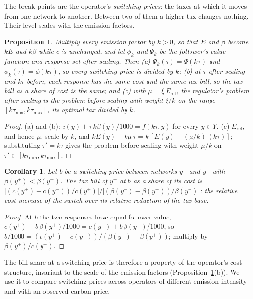\documentclass[review,11pt,nonatbib]{elsarticle}
\newtheorem{proposition}{Proposition}
\newtheorem{corollary}{Corollary}
\theoremstyle{remark}
\newcommand{\tmin}{\tau_{\min}}
\newcommand{\tmax}{\tau_{\max}}
\newcommand{\Eref}{E_{\mathrm{ref}}}
\begin{document}
The break points are the operator's \emph{switching prices}: the taxes at which it moves from one network to another. Between two of them a higher tax changes nothing. Their level scales with the emission factors.

\begin{proposition}\label{prop:scale}
Multiply every emission factor by $k > 0$, so that $E$ and $\beta$ become $kE$ and $k\beta$ while $c$ is unchanged, and let $\phi_k$ and $\Psi_k$ be the follower's value function and response set after scaling. Then (a) $\Psi_k(\tau) = \Psi(k\tau)$ and $\phi_k(\tau) = \phi(k\tau)$, so every switching price is divided by $k$; (b) at $\tau$ after scaling and $k\tau$ before, each response has the same cost and the same tax bill, so the tax bill as a share of cost is the same; and (c) with $\mu = \xi\,\Eref$, the regulator's problem after scaling is the problem before scaling with weight $\xi/k$ on the range $[k\tmin, k\tmax]$, its optimal tax divided by $k$.
\end{proposition}
\begin{proof}
(a) and (b): $c(y) + \tau\,k\beta(y)/1000 = f(k\tau, y)$ for every $y \in Y$. (c) $\Eref$, and hence $\mu$, scale by $k$, and $kE(y) + k\mu\,\tau = k\,[E(y) + (\mu/k)\,(k\tau)]$; substituting $\tau' = k\tau$ gives the problem before scaling with weight $\mu/k$ on $\tau' \in [k\tmin, k\tmax]$.
\end{proof}

\begin{corollary}\label{cor:bill}
Let $b$ be a switching price between networks $y^-$ and $y^+$ with $\beta(y^+) < \beta(y^-)$. The tax bill of $y^+$ at $b$ as a share of its cost is $\bigl[(c(y^+) - c(y^-))/c(y^+)\bigr] \big/ \bigl[(\beta(y^-) - \beta(y^+))/\beta(y^+)\bigr]$: the relative cost increase of the switch over its relative reduction of the tax base.
\end{corollary}
\begin{proof}
At $b$ the two responses have equal follower value, $c(y^+) + b\,\beta(y^+)/1000 = c(y^-) + b\,\beta(y^-)/1000$, so $b/1000 = (c(y^+) - c(y^-))/(\beta(y^-) - \beta(y^+))$; multiply by $\beta(y^+)/c(y^+)$.
\end{proof}

The bill share at a switching price is therefore a property of the operator's cost structure, invariant to the scale of the emission factors (Proposition~\ref{prop:scale}(b)). We use it to compare switching prices across operators of different emission intensity and with an observed carbon price.
\end{document}
